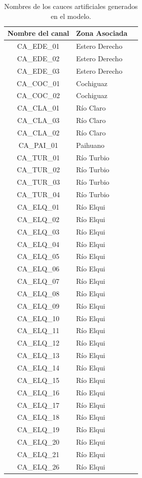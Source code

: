 \documentclass[11pt,]{article}
\begin{document}
\begin{table}[H]
\centering
\caption{Nombres de los cauces artificiales generados en el modelo.}
\label{tabla5}
\begin{tabular}{@{}cll@{}}
\toprule
\multicolumn{1}{c}{\textbf{Nombre del canal}} & \multicolumn{1}{c}{\textbf{Zona Asociada}} \\ \midrule
 CA\_EDE\_01 & Estero Derecho \\
 CA\_EDE\_02 & Estero Derecho \\
 CA\_EDE\_03 & Estero Derecho \\
 CA\_COC\_01 & Cochiguaz \\
 CA\_COC\_02 & Cochiguaz \\
 CA\_CLA\_01 & Río Claro \\
 CA\_CLA\_03 & Río Claro \\
 CA\_CLA\_02 & Río Claro \\
 CA\_PAI\_01 & Paihuano \\
 CA\_TUR\_01 & Río Turbio \\
 CA\_TUR\_02 & Río Turbio \\
 CA\_TUR\_03 & Río Turbio \\
 CA\_TUR\_04 & Río Turbio \\
 CA\_ELQ\_01 & Río Elqui \\
 CA\_ELQ\_02 & Río Elqui \\
 CA\_ELQ\_03 & Río Elqui \\
 CA\_ELQ\_04 & Río Elqui \\
 CA\_ELQ\_05 & Río Elqui \\
 CA\_ELQ\_06 & Río Elqui \\
 CA\_ELQ\_07 & Río Elqui \\
 CA\_ELQ\_08 & Río Elqui \\
 CA\_ELQ\_09 & Río Elqui \\
 CA\_ELQ\_10 & Río Elqui \\
 CA\_ELQ\_11 & Río Elqui \\
 CA\_ELQ\_12 & Río Elqui \\
 CA\_ELQ\_13 & Río Elqui \\
 CA\_ELQ\_14 & Río Elqui \\
 CA\_ELQ\_15 & Río Elqui \\
 CA\_ELQ\_16 & Río Elqui \\
 CA\_ELQ\_17 & Río Elqui \\
 CA\_ELQ\_18 & Río Elqui \\
 CA\_ELQ\_19 & Río Elqui \\
 CA\_ELQ\_20 & Río Elqui \\
 CA\_ELQ\_21 & Río Elqui \\
 CA\_ELQ\_26 & Río Elqui \\ \bottomrule
\end{tabular}
\end{table}
\end{document}
